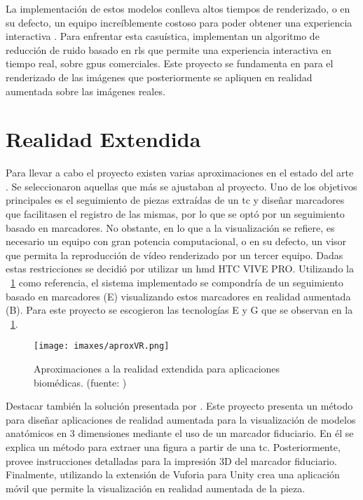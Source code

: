 La implementación de estos modelos conlleva altos tiempos de renderizado, o en su defecto, un equipo increíblemente costoso para poder obtener una experiencia interactiva \cite{IglesiasGuitian2022}. Para enfrentar esta casuística, \citeauthor{IglesiasGuitian2022} implementan un algoritmo de reducción de ruido basado en \acrfull{rls} que permite una experiencia interactiva en tiempo real, sobre \acrshort{gpu}s comerciales. Este proyecto se fundamenta en \cite{IglesiasGuitian2022} para el renderizado de las imágenes que posteriormente se apliquen en realidad aumentada sobre las imágenes reales.

\section{Realidad Extendida}

Para llevar a cabo el proyecto existen varias aproximaciones en el estado del arte \cite{Venkatesan2021}. Se seleccionaron aquellas que más se ajustaban al proyecto.
Uno de los objetivos principales es el seguimiento de piezas extraídas de un \acrshort{tc} y diseñar marcadores que facilitasen el registro de las mismas, por lo que se optó por un seguimiento basado en marcadores. No obstante, en lo que a la visualización se refiere, es necesario un equipo con gran potencia computacional, o en su defecto, un visor que permita la reproducción de vídeo renderizado por un tercer equipo. Dadas estas restricciones se decidió por utilizar un \acrfull{hmd} HTC VIVE PRO. Utilizando la \figurename~\ref{fig:vrAproximations} \cite{Venkatesan2021} como referencia, el sistema implementado se compondría de un seguimiento basado en marcadores (E) visualizando estos marcadores en realidad aumentada (B).
Para este proyecto se escogieron las tecnologías E y G que se observan en la \figurename~\ref{fig:vrAproximations}.

\begin{figure}
	\centering
	\texttt{[image: imaxes/aproxVR.png]}
	\caption{Aproximaciones a la realidad extendida para aplicaciones biomédicas. (fuente: \cite{Venkatesan2021})}
	\label{fig:vrAproximations}
\end{figure}

Destacar también la solución presentada por \cite{MoretaMartinez2020}. Este proyecto presenta un método para diseñar aplicaciones de realidad aumentada para la visualización de modelos anatómicos en 3 dimensiones mediante el uso de un marcador fiduciario. En él se explica un método para extraer una figura a partir de una \acrshort{tc}. Posteriormente, provee instrucciones detalladas para la impresión 3D del marcador fiduciario. Finalmente, utilizando la extensión de Vuforia para Unity crea una aplicación móvil que permite la visualización en realidad aumentada de la pieza.

